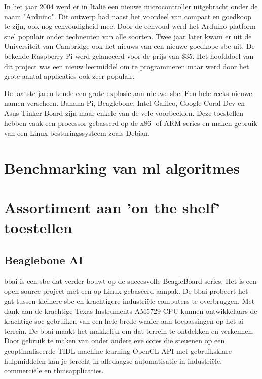 	
	In het jaar 2004 werd er in Itali\"e een nieuwe microcontroller uitgebracht onder de naam "Arduino". Dit ontwerp had naast het voordeel van compact en goedkoop te zijn, ook nog eenvoudigheid mee. Door de eenvoud werd het Arduino-platform snel populair onder techneuten van alle soorten. 
	Twee jaar later kwam er uit de Universiteit van Cambridge ook het nieuws van een nieuwe goedkope \gls{sbc} uit. De bekende Raspberry Pi werd gelanceerd voor de prijs van \$35. Het hoofddoel van dit project was een nieuw leermiddel om te programmeren maar werd door het grote aantal applicaties ook zeer populair.
	
	De laatste jaren kende een grote explosie aan nieuwe \gls{sbc}. Een hele reeks nieuwe namen verscheen. Banana Pi, Beaglebone, Intel Galileo, Google Coral Dev en Asus Tinker Board zijn maar enkele van de vele voorbeelden. Deze toestellen hebben vaak een processor gebasserd op de x86- of ARM-series en maken gebruik van een Linux besturingssysteem zoals Debian.
	


\newpage

\section{Benchmarking van \gls{ml} algoritmes}



\newpage

\section{Assortiment aan 'on the shelf' toestellen}

	\subsection{Beaglebone AI}
	\gls{bbai} is een \gls{sbc} dat verder bouwt op de succesvolle  BeagleBoard-series. Het is een open source project met een op Linux gebaseerd aanpak. De \gls{bbai} probeert het gat tussen kleinere \gls{sbc} en krachtigere industri\"ele computers te overbruggen. Met dank aan de krachtige Texas Instruments AM5729 CPU kunnen ontwikkelaars de krachtige \gls{soc} gebruiken van een hele brede waaier aan toepassingen op het \gls{ai} terrein. De \gls{bbai} maakt het makkelijk om dat terrein te ontdekken en verkennen. Door gebruik te maken van onder andere \gls{eve} cores die steuenen op een geoptimaliseerde TIDL machine learning OpenCL API met gebruiksklare hulpmiddelen kan je terecht in alledaagse automatisatie in industri\"ele, commerci\"ele en thuisapplicaties.
	
